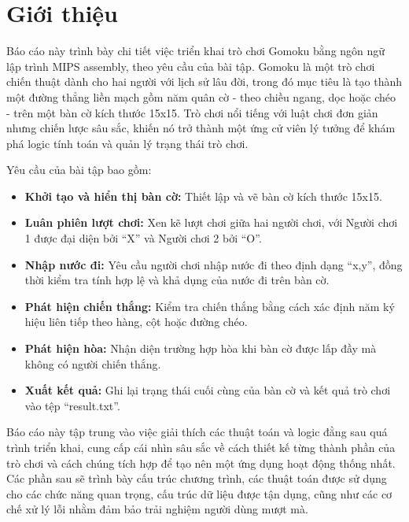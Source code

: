 \section{Giới thiệu}
Báo cáo này trình bày chi tiết việc triển khai trò chơi Gomoku bằng ngôn ngữ lập trình MIPS assembly, theo yêu cầu của bài tập. Gomoku là một trò chơi chiến thuật dành cho hai người với lịch sử lâu đời, trong đó mục tiêu là tạo thành một đường thẳng liền mạch gồm năm quân cờ - theo chiều ngang, dọc hoặc chéo - trên một bàn cờ kích thước 15x15. Trò chơi nổi tiếng với luật chơi đơn giản nhưng chiến lược sâu sắc, khiến nó trở thành một ứng cử viên lý tưởng để khám phá logic tính toán và quản lý trạng thái trò chơi.

Yêu cầu của bài tập bao gồm:
\begin{itemize}
    \item \textbf{Khởi tạo và hiển thị bàn cờ:} Thiết lập và vẽ bàn cờ kích thước 15x15.
    \item \textbf{Luân phiên lượt chơi:} Xen kẽ lượt chơi giữa hai người chơi, với Người chơi 1 được đại diện bởi “X” và Người chơi 2 bởi “O”.
    \item \textbf{Nhập nước đi:} Yêu cầu người chơi nhập nước đi theo định dạng “x,y”, đồng thời kiểm tra tính hợp lệ và khả dụng của nước đi trên bàn cờ.
    \item \textbf{Phát hiện chiến thắng:} Kiểm tra chiến thắng bằng cách xác định năm ký hiệu liên tiếp theo hàng, cột hoặc đường chéo.
    \item \textbf{Phát hiện hòa:} Nhận diện trường hợp hòa khi bàn cờ được lấp đầy mà không có người chiến thắng.
    \item \textbf{Xuất kết quả:} Ghi lại trạng thái cuối cùng của bàn cờ và kết quả trò chơi vào tệp “result.txt”.
\end{itemize}

Báo cáo này tập trung vào việc giải thích các thuật toán và logic đằng sau quá trình triển khai, cung cấp cái nhìn sâu sắc về cách thiết kế từng thành phần của trò chơi và cách chúng tích hợp để tạo nên một ứng dụng hoạt động thống nhất. Các phần sau sẽ trình bày cấu trúc chương trình, các thuật toán được sử dụng cho các chức năng quan trọng, cấu trúc dữ liệu được tận dụng, cũng như các cơ chế xử lý lỗi nhằm đảm bảo trải nghiệm người dùng mượt mà.